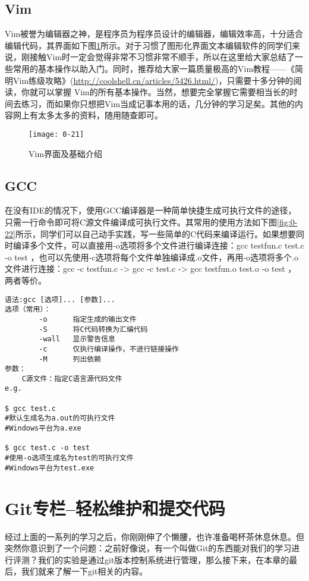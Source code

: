\subsection{Vim}
Vim被誉为编辑器之神，是程序员为程序员设计的编辑器，编辑效率高，十分适合编辑代码，其界面如下图\ref{fig:0-21}所示。对于习惯了图形化界面文本编辑软件的同学们来说，刚接触Vim时一定会觉得非常不习惯非常不顺手，所以在这里给大家总结了一些常用的基本操作以助入门。同时，推荐给大家一篇质量极高的Vim教程——《简明Vim练级攻略》(\url{http://coolshell.cn/articles/5426.html/})，只需要十多分钟的阅读，你就可以掌握 Vim的所有基本操作。当然，想要完全掌握它需要相当长的时间去练习，而如果你只想把Vim当成记事本用的话，几分钟的学习足矣。其他的内容网上有太多太多的资料，随用随查即可。

\begin{figure}[htbp]
  \centering
  \texttt{[image: 0-21]}
  \caption{Vim界面及基础介绍}\label{fig:0-21}
\end{figure}

\subsection{GCC}
在没有IDE的情况下，使用GCC编译器是一种简单快捷生成可执行文件的途径，只需一行命令即可将C源文件编译成可执行文件。其常用的使用方法如下图\ref{fig:0-22}所示，同学们可以自己动手实践，写一些简单的C代码来编译运行。如果想要同时编译多个文件，可以直接用-o选项将多个文件进行编译连接：gcc testfun.c test.c -o test ，也可以先使用-c选项将每个文件单独编译成.o文件，再用-o选项将多个.o文件进行连接：gcc -c testfun.c -> gcc -c test.c -> gcc testfun.o test.o -o test ，两者等价。

\begin{verbatim}
语法:gcc [选项]... [参数]...
选项（常用）：
		-o		指定生成的输出文件
		-S		将C代码转换为汇编代码
		-wall	显示警告信息
		-c		仅执行编译操作，不进行链接操作
		-M		列出依赖
参数：
	C源文件：指定C语言源代码文件
e.g.

$ gcc test.c
#默认生成名为a.out的可执行文件
#Windows平台为a.exe

$ gcc test.c -o test
#使用-o选项生成名为test的可执行文件
#Windows平台为test.exe
\end{verbatim}

\section{Git专栏--轻松维护和提交代码}
经过上面的一系列的学习之后，你刚刚伸了个懒腰，也许准备喝杯茶休息休息。但突然你意识到了一个问题：之前好像说，有一个叫做Git的东西能对我们的学习进行评测？我们的实验是通过git版本控制系统进行管理，那么接下来，在本章的最后，我们就来了解一下git相关的内容。
